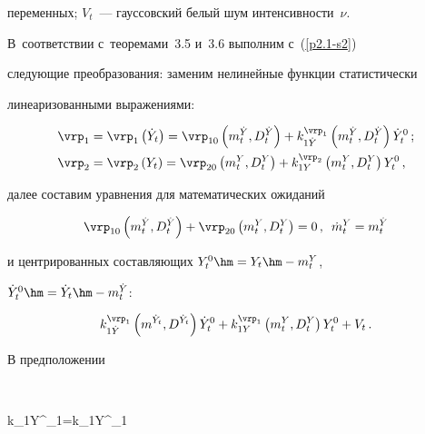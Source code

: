 {переменных; $V_t$~--- гауссовский белый шум интенсивности~$\nu$. 

В~соответствии с~теоремами~3.5 и~3.6 выполним с~(\ref{p2.1-s2}) 

следующие преобразования: заменим нелинейные функции статистически 

линеаризованными выражениями:

\begin{align*}

     \vrp_1&=\vrp_1 \left(\dot Y_t\right) = \vrp_{10} 

     \left( m_t^{\dot Y}, D_t^{\dot Y}\right) + 

     k_{1\dot Y}^{\vrp_1}\left( m_t^{\dot Y}, D_t^{\dot Y}\right) \dot Y_t^0\,;\\

     \vrp_2&=\vrp_2 \left(Y_t\right) = \vrp_{20} \left( m_t^{Y}, D_t^{Y}\right) + 

     k_{1 Y}^{\vrp_2}\left( m_t^{Y}, D_t^{ Y}\right) Y_t^0\,,


     \end{align*}

далее составим уравнения для математических ожиданий

\begin{equation}

\vrp_{10} \left( m_t^{\dot Y}, D_t^{\dot Y}\right)+\vrp_{20} 

\left( m_t^{Y}, D_t^{Y}\right) =0\,,\enskip  

\dot m_t^{Y}= m_t^{\dot Y} \label{p2.3-s2}

\end{equation}

и центрированных составляющих $Y_t^0 \hm= Y_t\hm - m_t^Y$, 

$\dot Y_t^0 \hm= \dot Y_t\hm - m_t^{\dot Y}$:

\begin{equation}

k_{1\dot Y}^{\vrp_1}\left( m^{\dot Y_t}, D^{\dot Y_t}\right)

\dot Y_t^0 +k_{1 Y}^{\vrp_1}\left( m_t^{  Y}, D_t^{ Y}\right) Y_t^0 + V_t\,.

\label{p2.4-s2}

\end{equation}

В предположении

     $$

     k_{1\dot Y}^{\vrp_1}=k_{1\dot Y}^{\vrp_1}

}
